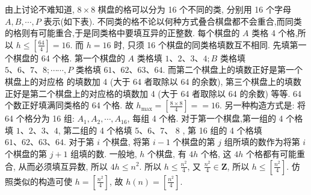 由上讨论不难知道, $8 \times 8$ 棋盘的格可以分为 16 个不同的类, 分别用 16 个字母 $A, B, \cdots, P$ 表示(如下表). 不同类的格不论以何种方式叠合棋盘都不会重合,而同类的格则有可能重合,于是同类格中要填互异的正整数.
每个棋盘的 $A$ 类格 4 个格,所以 $h \leqslant\left[\frac{64}{4}\right]=16$. 而 $h=16$ 时, 只须 16 个棋盘的同类格填数互不相同.
先填第一个棋盘的 64 个格.
第一个棋盘的 $A$ 类格填 $1 、 2 、 3 、 4 ; B$ 类格填 $5 、 6 、 7 、 8 ; \cdots \cdots, P$ 类格填 $61 、 62 、 63 、 64$. 而第二个棋盘上的填数正好是第一个棋盘上的对应格 的填数加 4 (大于 64 者取除以 64 的余数), 第三个棋盘上的填数正好是第二个棋盘上的对应格的填数加 4 (大于 64 者取除以 64 的余数) 等等.
64 个数正好填满同类格的 64 个格.
故 $h_{\max }=\left[\frac{8 \times 8}{4}\right]==16$.
另一种构造方式是: 将 64 个格分为 16 组: $A_1, A_2, \cdots, A_{16}$, 每组 4 个格.
对于第一个棋盘,第一组的 4 个格填 $1 、 2 、 3 、 4$, 第二组的 4 个格填 5、6、7、 8 , 第 16 组的 4 个格填 $61 、 62 、 63 、 64$. 对于第 $i$ 个棋盘, 将第 $i-1$ 个棋盘的第 $j$ 组所填的数作为将第 $i$ 个棋盘的第 $j+1$ 组填的数.
一般地, $h$ 个棋盘, 有 $4 h$ 个格, 这 $4 h$ 个格都有可能重合, 从而必须填互异数, 所以 $4 h \leqslant n^2$. 所以 $h \leqslant \frac{n^2}{4}$, 又 $\frac{n^2}{4} \in \mathbf{Z}$, 所以 $h \leqslant\left[\frac{n^2}{4}\right]$. 仿照类似的构造可使 $h=\left[\frac{n^2}{4}\right]$, 故 $h(n)=\left[\frac{n^2}{4}\right]$.



